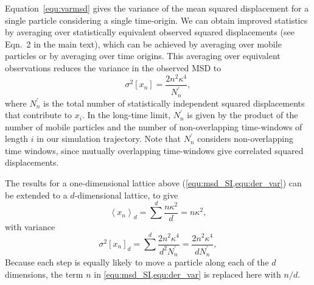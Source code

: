 \documentclass[reprint,superscriptaddress,nobibnotes,amsmath,amssymb,aps,prx,hidelinks]{revtex4-2}
\newcommand{\oMSDi}{\ensuremath{x_i}}
\newcommand{\oMSDn}{\ensuremath{x_n}}
\newcommand{\moMSDn}{\ensuremath{\left<\oMSDn\right>}}
\newcommand{\nind}[1]{\ensuremath{N^\prime_{#1}}}
\newcommand{\var}[1]{\ensuremath{\sigma^2[#1]}}
\begin{document}
Equation~\ref{equ:varmsd} gives the variance of the mean squared displacement for a single particle considering a single time-origin.
We can obtain improved statistics by averaging over statistically equivalent observed squared displacements (see Eqn.~2 in the main text), which can be achieved by averaging over mobile particles or by averaging over time origins.
This averaging over equivalent observations reduces the variance in the observed MSD to
\begin{equation}
    \var{\oMSDn} = \frac{2n^2\kappa^4}{\nind{n}},
\label{equ:der_var}
\end{equation}
where $\nind{n}$ is the total number of statistically independent squared displacements that contribute to $\oMSDi$.
In the long-time limit, $\nind{n}$ is given by the product of the number of mobile particles and the number of non-overlapping time-windows of length $i$ in our simulation trajectory.
Note that $\nind{n}$ considers non-overlapping time windows, since mutually overlapping time-windows give correlated squared displacements.

The results for a one-dimensional lattice above (\cref{equ:msd_SI,equ:der_var}) can be extended to a $d$-dimensional lattice, to give
\begin{equation}
    \moMSDn_{d} = \sum^d{\frac{n\kappa^2}{d}} = n\kappa^2,
\end{equation}
with variance
\begin{equation}
    \var{\oMSDn}_d = \sum^d{\frac{2n^2\kappa^4}{d^2\nind{n}}} = \frac{2n^2\kappa^4}{d\nind{n}},
\end{equation}
Because each step is equally likely to move a particle along each of the $d$ dimensions, the term $n$ in \cref{equ:msd_SI,equ:der_var} is replaced here with $n/d$.
\end{document}
